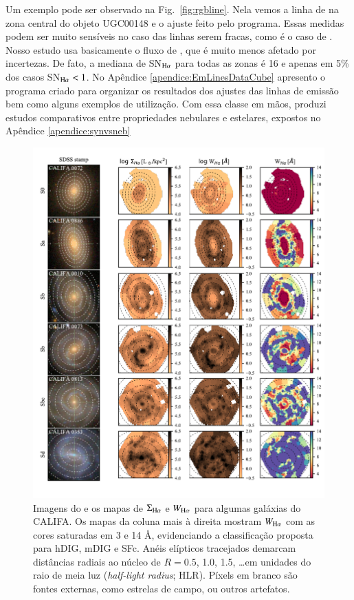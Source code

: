 Um exemplo pode ser observado na Fig.\ \ref{fig:rgbline}. Nela vemos a linha de \Hb na zona central do objeto UGC00148 e o ajuste feito pelo programa. Essas medidas podem ser muito sensíveis no caso das linhas serem fracas, como é o caso de \Hb. Nosso estudo usa basicamente o fluxo de \Ha, que é muito menos afetado por incertezas. De fato, a mediana de SN$_{\Ha}$ para todas as zonas é 16 e apenas em 5\% dos casos SN$_{\Ha} < 1$. No Apêndice \ref{apendice:EmLinesDataCube} apresento o programa criado para organizar os resultados dos ajustes das linhas de emissão bem como alguns exemplos de utilização. Com essa classe em mãos, produzi estudos comparativos entre propriedades nebulares e estelares, expostos no Apêndice \ref{apendice:synvsneb}

\begin{figure}
\includegraphics[scale=0.9]{figuras/fig_maps_class_faceon_paper.pdf}
 \caption[Imagem \SDSS e mapas de $\Sigma_{{\rm H}\alpha}$ e $W_{{\rm H}\alpha}$]
 {Imagens do \SDSS e os mapas de $\Sigma_{\Ha}$ e $W_{\Ha}$ para algumas galáxias do CALIFA. Os mapas da coluna mais à direita mostram $W_{\Ha}$ com as cores saturadas em 3 e 14 \AA, evidenciando a classificação proposta para hDIG, mDIG e SFc. Anéis elípticos tracejados demarcam distâncias radiais ao núcleo de $R = 0.5$, 1.0, 1.5, \dots em unidades do raio de meia luz ({\em half-light radius}; HLR). Píxels em branco são fontes externas, como estrelas de campo, ou outros artefatos.}
 \label{fig:ExampleMaps}
\end{figure}

